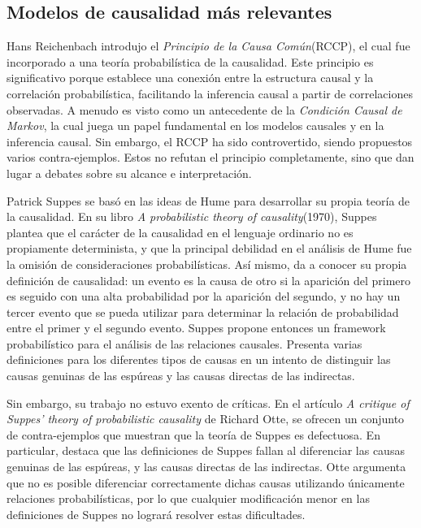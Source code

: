\begin{introduction}
	\subsection{Modelos de causalidad más relevantes}
	
	Hans Reichenbach introdujo el \textit{Principio de la Causa Común}(RCCP), el cual fue incorporado a una teoría probabilística de la causalidad. Este principio es significativo porque establece una conexión entre la estructura causal y la correlación probabilística, facilitando la inferencia causal a partir de correlaciones observadas. A menudo es visto como un antecedente de la \textit{Condición Causal de Markov}, la cual juega un papel fundamental en los modelos causales y en la inferencia causal. Sin embargo, el RCCP ha sido controvertido, siendo propuestos varios contra-ejemplos. Estos no refutan el principio completamente, sino que dan lugar a debates sobre su alcance e interpretación.\cite{sep-physics-Rpcc}
	
	Patrick Suppes se basó en las ideas de Hume para desarrollar su propia teoría de la causalidad. En su libro \textit{A probabilistic theory of causality}(1970)\cite{Suppes1968-SUPAPT}, Suppes plantea que el carácter de la causalidad en el lenguaje ordinario no es propiamente determinista, y que la principal debilidad en el análisis de Hume fue la omisión de consideraciones probabilísticas. Así mismo, da a conocer su propia definición de causalidad: un evento es la causa de otro si la aparición del primero es seguido con una alta probabilidad por la aparición del segundo, y no hay un tercer evento que se pueda utilizar para determinar la relación de probabilidad entre el primer y el segundo evento. Suppes propone entonces un framework probabilístico para el análisis de las relaciones causales. Presenta varias definiciones para los diferentes tipos de causas en un intento de distinguir las causas genuinas de las espúreas y las causas directas de las indirectas.
	
	Sin embargo, su trabajo no estuvo exento de críticas. En el artículo \textit{A critique of Suppes' theory of probabilistic causality} de Richard Otte, se ofrecen un conjunto de contra-ejemplos que muestran que la teoría de Suppes es defectuosa. En particular, destaca que las definiciones de Suppes fallan al diferenciar las causas genuinas de las espúreas, y las causas directas de las indirectas. Otte argumenta que no es posible diferenciar correctamente dichas causas utilizando únicamente relaciones probabilísticas, por lo que cualquier modificación menor en las definiciones de Suppes no logrará resolver estas dificultades.\cite{otte1981critique}
	

\end{introduction}
